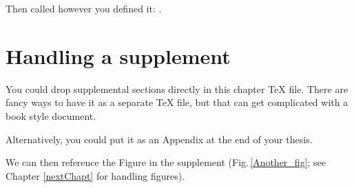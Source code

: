 Then called however you defined it: \oddname.

\section{Handling a supplement}

You could drop supplemental sections directly in this chapter \TeX{} file. There are fancy ways to have it as a separate \TeX{} file, but that can get complicated with a book style document. 

Alternatively, you could put it as an Appendix at the end of your thesis. 

We can then reference the Figure in the supplement (Fig.\,\ref{Another_fig}; see Chapter \ref{nextChapt} for handling figures). 










